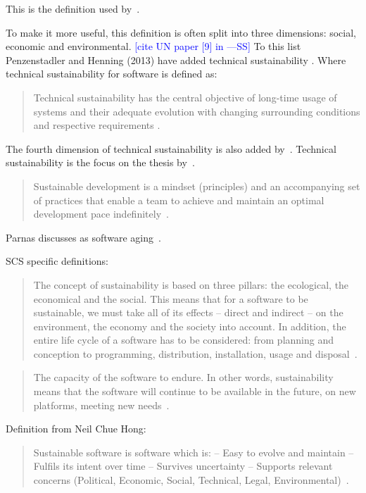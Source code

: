 \documentclass[letterpaper,cleveref]{lipics-v2019}
\newcommand{\authornote}[3]{\textcolor{#1}{[#3 ---#2]}}
\newcommand{\authornote}[3]{}
\newcommand{\wss}[1]{\authornote{blue}{SS}{#1}} %
\theoremstyle{definition}
\begin{document}
This is the definition used by~\cite{IISD2019}.

To make it more useful, this definition is often split into three dimensions:
social, economic and environmental. \wss{cite UN paper [9] in
  \cite{PenzenstadlerAndHenning2013}}  To this list Penzenstadler and Henning
(2013) have added technical sustainability \cite{PenzenstadlerAndHenning2013}.
Where technical sustainability for software is defined as:

\begin{quotation}
\noindent Technical sustainability has the central objective of long-time
usage of systems and their adequate evolution with changing surrounding
conditions and respective requirements \cite{PenzenstadlerAndHenning2013}.
\end{quotation}

The fourth dimension of technical sustainability is also added
by~\cite{WolframEtAl2017}.  Technical sustainability is the focus on the thesis
by~\cite{Hygerth2016}.

\begin{quotation}
  \noindent Sustainable development is a mindset (principles) and an
  accompanying set of practices that enable a team to achieve and maintain an
  optimal development pace indefinitely~\cite{Tate2005}.
\end{quotation}

Parnas discusses as software aging~\cite{Parnas1994a}.

SCS specific definitions:

\begin{quotation}
  \noindent The concept of sustainability is based on three pillars: the
  ecological, the economical and the social. This means that for a software to
  be sustainable, we must take all of its effects -- direct and indirect -- on
  the environment, the economy and the society into account. In addition, the
  entire life cycle of a software has to be considered: from planning and
  conception to programming, distribution, installation, usage and
  disposal~\cite{Heine2017}.
\end{quotation}

\begin{quotation}
  \noindent The capacity of the software to endure. In other words,
  sustainability means that the software will continue to be available in the
  future, on new platforms, meeting new needs~\cite{Katz2016}.
\end{quotation}

Definition from Neil Chue Hong:
\begin{quotation}
\noindent Sustainable software is software which is:
-- Easy to evolve and maintain
-- Fulfils its intent over time
-- Survives uncertainty
-- Supports relevant concerns (Political, Economic, Social, Technical,
Legal, Environmental)~\cite{Katz2016}.
\end{quotation}
\end{document}
